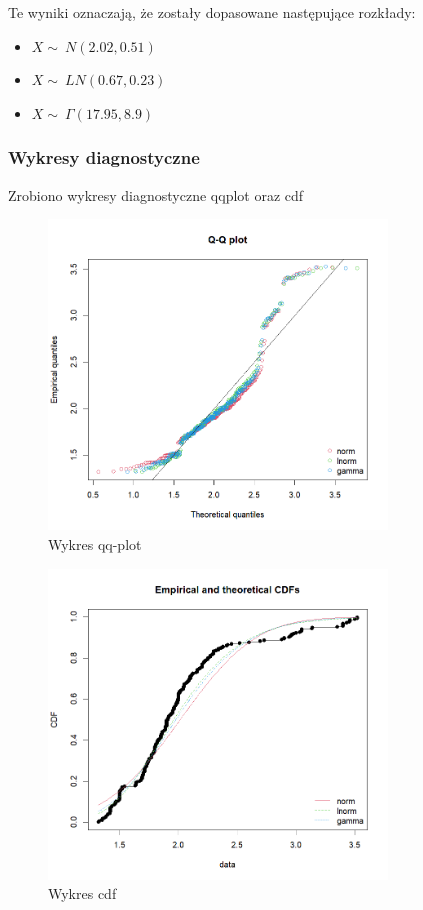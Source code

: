 \documentclass[a4paper,11pt]{article}
\begin{document}
 Te wyniki oznaczają, że zostały dopasowane następujące rozkłady:

\begin{itemize}
  \item $X \sim\ N(2.02, 0.51)$
  \item $X \sim\ LN(0.67, 0.23)$
  \item $X \sim\ \Gamma(17.95, 8.9)$

\end{itemize}

\subsubsection{Wykresy diagnostyczne}
Zrobiono wykresy diagnostyczne qqplot oraz cdf

\begin{figure}[htb]
  \centering
  \includegraphics[width=9cm]{jjb_qqplot.png}
  \caption{Wykres qq-plot}
  \label{fig:jjb_qqplot}
\end{figure}

\begin{figure}[h]
  \centering
  \includegraphics[width=9cm]{jjb_cdf.png}
  \caption{Wykres cdf}
  \label{fig:jjb_cdf}
\end{figure}
\end{document}
